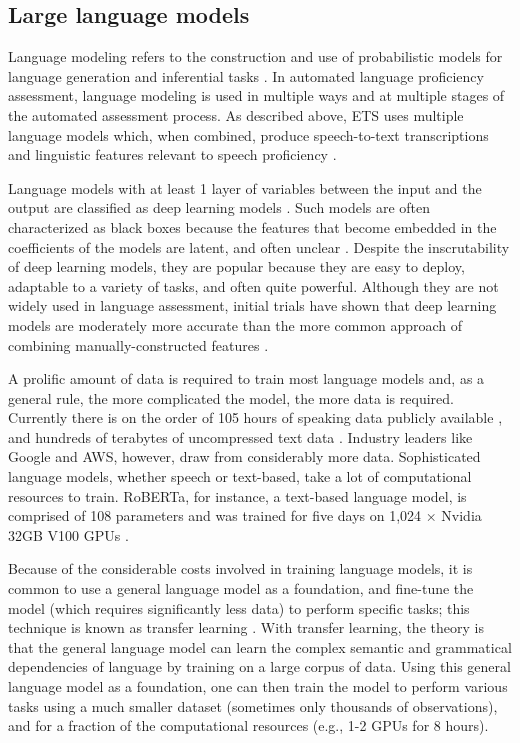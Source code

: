 \documentclass [PhD] {uclathes}
\begin{document}
\subsection{Large language models}

Language modeling refers to the construction and use of probabilistic models for language generation and inferential tasks \citep{jurafskyspeech}. In automated language proficiency assessment, language modeling is used in multiple ways and at multiple stages of the automated assessment process. As described above, ETS uses multiple language models which, when combined, produce speech-to-text transcriptions and linguistic features relevant to speech proficiency \citep{qian2019automatic}.

Language models with at least 1 layer of variables between the input and the output are classified as deep learning models \citep{goodfellow2016deep}. Such models are often characterized as black boxes because the features that become embedded in the coefficients of the models are latent, and often unclear \citep[e.g.][]{gretter2019automatic}. Despite the inscrutability of deep learning models, they are popular because they are easy to deploy, adaptable to a variety of tasks, and often quite powerful. Although they are not widely used in language assessment, initial trials have shown that deep learning models are moderately more accurate than the more common approach of combining manually-constructed features \citep{chen2018end}.

A prolific amount of data is required to train most language models and, as a general rule, the more complicated the model, the more data is required. Currently there is on the order of 105 hours of speaking data publicly available \citep{galvez2021people}, and hundreds of terabytes of uncompressed text data \citep{iderhoff2023}. Industry leaders like Google and AWS, however, draw from considerably more data. Sophisticated language models, whether speech or text-based, take a lot of computational resources to train. RoBERTa, for instance, a text-based language model, is comprised of 108 parameters and was trained for five days on 1,024 × Nvidia 32GB V100 GPUs \citep{liu2019roberta}.

Because of the considerable costs involved in training language models, it is common to use a general language model as a foundation, and fine-tune the model (which requires significantly less data) to perform specific tasks; this technique is known as transfer learning \citep{jurafskyspeech}. With transfer learning, the theory is that the general language model can learn the complex semantic and grammatical dependencies of language by training on a large corpus of data. Using this general language model as a foundation, one can then train the model to perform various tasks using a much smaller dataset (sometimes only thousands of observations), and for a fraction of the computational resources (e.g., 1-2 GPUs for 8 hours).
\end{document}
